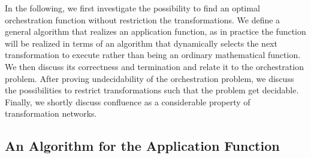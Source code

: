 In the following, we first investigate the possibility to find an optimal orchestration function without restriction the transformations.
We define a general algorithm that realizes an application function, as in practice the function will be realized in terms of an algorithm that dynamically selects the next transformation to execute rather than being an ordinary mathematical function.
We then discuss its correctness and termination and relate it to the orchestration problem.
After proving undecidability of the orchestration problem, we discuss the possibilities to restrict transformations such that the problem get decidable.
Finally, we shortly discuss confluence as a considerable property of transformation networks.



\subsection{An Algorithm for the Application Function}


